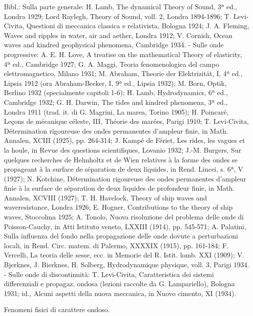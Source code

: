 \documentclass[a4paper]{article}
\begin{document}
Bibl.: Sulla parte generale: H. Lamb, The dynamical Theory of Sound, 3ª ed., Londra 1929; Lord Raylegh, Theory of Sound, voll. 2, Londra 1894-1896; T. Levi-Civita, Questioni di meccanica classica e relativista, Bologna 1924; J. A. Fleming, Waves and ripples in water, air and aether, Londra 1912; V. Cornish, Ocean waves and kindred geophysical phenomena, Cambridge 1934. - Sulle onde progressive: A. E. H. Love, A treatise on the mathematical Theory of elasticity, 4ª ed., Cambridge 1927; G. A. Maggi, Teoria fenomenologica del campo elettromagnetico, Milano 1931; M. Abraham, Theorie der Elektrizität, I, 4ª ed., Lipsia 1912 (ora Abraham-Becker, I, 9ª ed., Lipsia 1932); M. Born, Optik, Berlino 1932 (specialmente capitoli 1-6); H. Lamb, Hydrodynamics, 6ª ed., Cambridge 1932; G. H. Darwin, The tides and kindred phenomena, 3ª ed., Londra 1911 (trad. it. di G. Magrini, La marea, Torino 1905); H. Poincaré, Leçons de mécanique céleste, III, Théorie des marées, Parigi 1910; T. Levi-Civita, Détermination rigoureuse des ondes permanentes d'ampleur finie, in Math. Annalen, XCIII (1925), pp. 264-314; J. Kampé de Fériet, Les rides, les vagues et la houle, in Revue des questions scientifiques, Lovanio 1932; J.-M. Burgers, Sur quelques recherches de Helmholtz et de Wien relatives à la forme des ondes se propageant à la surface de séparation de deux liquides, in Rend. Lincei, s. 6ª, V (1927); N. Kotchine, Détermination rigoureuse des ondes permanentes d'ampleur finie à la surface de séparation de deux liquides de profondeur finie, in Math. Annalen, XCVIII (1927); T. H. Havelock, Theory of ship waves and waveresistance, Londra 1926; E. Hogner, Contributions to the theory of ship waves, Stoccolma 1925; A. Tonolo, Nuova risoluzione del problema delle onde di Poisson-Cauchy, in Atti Istituto veneto, LXXIII (1914), pp. 545-571; A. Palatini, Sulla influenza del fondo nella propagazione delle onde dovute a perturbazioni locali, in Rend. Circ. matem. di Palermo, XXXXIX (1915), pp. 161-184; F. Vercelli, La teoria delle sesse, ecc. in Memorie del R. Istit. lomb. XXI (1909); V. Bjerknes, J. Bierknes, H. Solberg, Hydrodynamique physique, voll. 3, Parigi 1934. - Sulle onde di discontinuità: T. Levi-Civita, Caratteristica dei sistemi differenziali e propagaz. ondosa (lezioni raccolte da G. Lampariello), Bologna 1931; id., Alcuni aspetti della nuova meccanica, in Nuovo cimento, XI (1934).

Fenomeni fisici di carattere ondoso.
\end{document}
